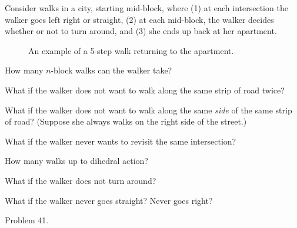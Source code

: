 \documentclass{article}
\begin{document}
Consider walks in a city, starting mid-block, where (1) at each intersection
the walker goes left right or straight, (2) at each mid-block, the walker
decides whether or not to turn around, and (3) she ends up back at her
apartment.
\begin{figure}[!h]
  \centering
  \caption{
    An example of a 5-step walk returning to the apartment.
  }
\end{figure}
\begin{question}
  How many $n$-block walks can the walker take?
\end{question}
\begin{related}
  \item What if the walker does not want to walk along the same strip of road
    twice?
  \item What if the walker does not want to walk along the same \textit{side} of
    the same strip of road? (Suppose she always walks on the right side of the
    street.)
  \item What if the walker never wants to revisit the same intersection?
  \item How many walks up to dihedral action?
  \item What if the walker does not turn around?
  \item What if the walker never goes straight? Never goes right?
\end{related}
\begin{references}
  \item Problem 41.
\end{references}
\end{document}
